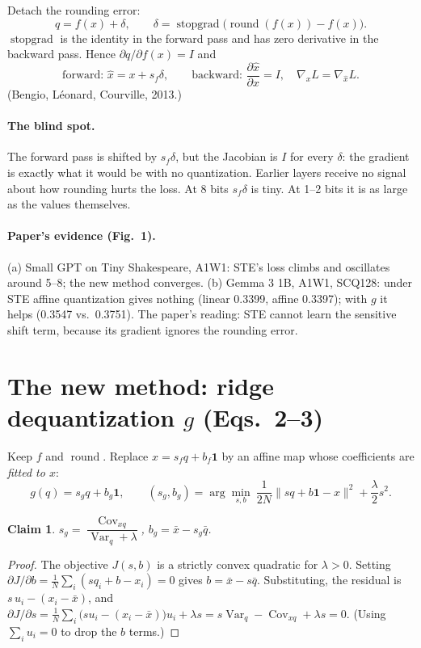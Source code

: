 \documentclass[11pt]{article}
\newcommand{\one}{\mathbf 1}
\newcommand{\Var}{\operatorname{Var}}
\newcommand{\Cov}{\operatorname{Cov}}
\newcommand{\sg}{\operatorname{stopgrad}}
\newcommand{\rnd}{\operatorname{round}}
\newtheorem*{claim}{Claim}
\begin{document}
Detach the rounding error:
\[
q=f(x)+\delta,\qquad \delta=\sg\big(\rnd(f(x))-f(x)\big).
\]
$\sg$ is the identity in the forward pass and has zero derivative in the backward pass. Hence $\partial q/\partial f(x)=I$ and
\[
\text{forward: }\hat x=x+s_f\delta,\qquad \text{backward: }\frac{\partial\hat x}{\partial x}=I,\quad \nabla_xL=\nabla_{\hat x}L.
\]
(Bengio, L\'eonard, Courville, 2013.)

\paragraph{The blind spot.} The forward pass is shifted by $s_f\delta$, but the Jacobian is $I$ for every $\delta$: the gradient is exactly what it would be with no quantization. Earlier layers receive no signal about how rounding hurts the loss. At 8 bits $s_f\delta$ is tiny. At 1--2 bits it is as large as the values themselves.

\paragraph{Paper's evidence (Fig.~1).} (a) Small GPT on Tiny Shakespeare, A1W1: STE's loss climbs and oscillates around 5--8; the new method converges. (b) Gemma 3 1B, A1W1, SCQ128: under STE affine quantization gives nothing (linear 0.3399, affine 0.3397); with $g$ it helps (0.3547 vs.\ 0.3751). The paper's reading: STE cannot learn the sensitive shift term, because its gradient ignores the rounding error.

\section{The new method: ridge dequantization $g$ (Eqs.~2--3)}

Keep $f$ and $\rnd$. Replace $\hat x=s_fq+b_f\one$ by an affine map whose coefficients are \emph{fitted to $x$}:
\[
g(q)=s_gq+b_g\one,\qquad
(s_g,b_g)=\arg\min_{s,b}\ \frac1{2N}\|sq+b\one-x\|^2+\frac\lambda2s^2 .
\]

\begin{claim}
$s_g=\dfrac{\Cov_{xq}}{\Var_q+\lambda}$, \quad $b_g=\bar x-s_g\bar q$.
\end{claim}
\begin{proof}
The objective $J(s,b)$ is a strictly convex quadratic for $\lambda>0$. Setting $\partial J/\partial b=\frac1N\sum_i(sq_i+b-x_i)=0$ gives $b=\bar x-s\bar q$. Substituting, the residual is $s\,u_i-(x_i-\bar x)$, and
$\partial J/\partial s=\frac1N\sum_i\big(s u_i-(x_i-\bar x)\big)u_i+\lambda s=s\Var_q-\Cov_{xq}+\lambda s=0$.
(Using $\sum_iu_i=0$ to drop the $b$ terms.)
\end{proof}
\end{document}
